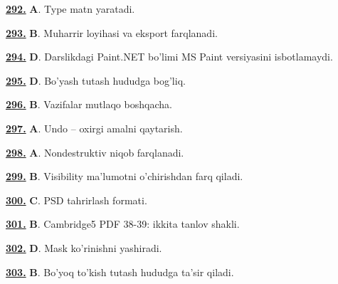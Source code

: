 \documentclass[10pt,a4paper,oneside]{article}
\begin{document}
\par\vspace{3mm}
\noindent\hyperlink{q292}{\textbf{292.}} \textbf{A}.  Type matn yaratadi.
\par\vspace{3mm}
\noindent\hyperlink{q293}{\textbf{293.}} \textbf{B}.  Muharrir loyihasi va eksport farqlanadi.
\par\vspace{3mm}
\noindent\hyperlink{q294}{\textbf{294.}} \textbf{D}.  Darslikdagi Paint.NET bo'limi MS Paint versiyasini isbotlamaydi.
\par\vspace{3mm}
\noindent\hyperlink{q295}{\textbf{295.}} \textbf{D}.  Bo'yash tutash hududga bog'liq.
\par\vspace{3mm}
\noindent\hyperlink{q296}{\textbf{296.}} \textbf{B}.  Vazifalar mutlaqo boshqacha.
\par\vspace{3mm}
\noindent\hyperlink{q297}{\textbf{297.}} \textbf{A}.  Undo -- oxirgi amalni qaytarish.
\par\vspace{3mm}
\noindent\hyperlink{q298}{\textbf{298.}} \textbf{A}.  Nondestruktiv niqob farqlanadi.
\par\vspace{3mm}
\noindent\hyperlink{q299}{\textbf{299.}} \textbf{B}.  Visibility ma'lumotni o'chirishdan farq qiladi.
\par\vspace{3mm}
\noindent\hyperlink{q300}{\textbf{300.}} \textbf{C}.  PSD tahrirlash formati.
\par\vspace{3mm}
\noindent\hyperlink{q301}{\textbf{301.}} \textbf{B}.  Cambridge5 PDF 38-39: ikkita tanlov shakli.
\par\vspace{3mm}
\noindent\hyperlink{q302}{\textbf{302.}} \textbf{D}.  Mask ko'rinishni yashiradi.
\par\vspace{3mm}
\noindent\hyperlink{q303}{\textbf{303.}} \textbf{B}.  Bo'yoq to'kish tutash hududga ta'sir qiladi.
\par\vspace{3mm}
\end{document}
